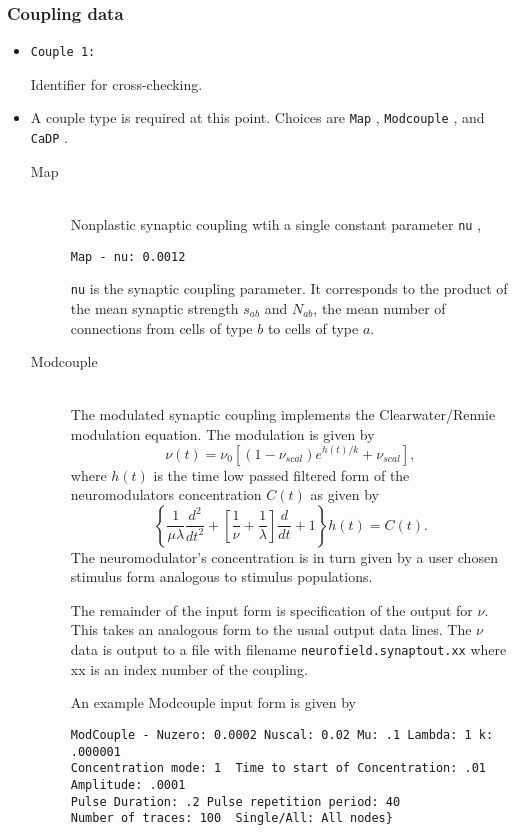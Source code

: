 \documentclass[12pt,a4paper]{article}
\newcommand{\type}[1]{ {\small\small\tt #1} }
\begin{document}
\subsubsection{Coupling data}
\label{sec:couple}

\begin{itemize}

	\item
	\begin{lstlisting}
Couple 1:
	\end{lstlisting}
	Identifier for cross-checking.
	\item A couple type is required at this point. Choices are \type{Map}, \type{Modcouple}, and \type{CaDP}.

\begin{description}

	\item[Map]\ \\
	Nonplastic synaptic coupling wtih a single constant parameter \type{nu},
	\begin{lstlisting}
Map - nu: 0.0012
	\end{lstlisting}
	\type{nu} is the synaptic coupling parameter. It corresponds to the product of the mean synaptic strength $s_{ab}$ and $N_{ab}$, the mean number of connections from cells of type $b$ to cells of type $a$.

	\item[Modcouple]\ \\
	The modulated synaptic coupling implements the Clearwater/Rennie modulation equation. The modulation is given by
	\[ \nu (t) = \nu_0 \left[ ( 1 - \nu_{scal} ) e^{h(t)/k} + \nu_{scal} \right], \]
	where $h(t)$ is the time low passed filtered form of the neuromodulators concentration $C(t)$ as given by
	\[
	\left\{ \frac{1}{\mu \lambda} \frac{d^2}{dt^2} +
	\left[ \frac{1}{\nu}+ \frac{1}{\lambda} 
	\right]
	\frac{d}{dt} + 1
	\right\}
	h(t) = C(t).
	\]
	The neuromodulator's concentration is in turn given by a user chosen stimulus form analogous to stimulus populations.

	The remainder of the input form is specification of the output for $\nu$.  This takes an analogous form to the usual output data lines. The $\nu$ data is output to a file with filename \type{neurofield.synaptout.xx} where xx is an index number of the coupling.

	An example Modcouple input form is given by
	\begin{lstlisting}
ModCouple - Nuzero: 0.0002 Nuscal: 0.02 Mu: .1 Lambda: 1 k: .000001
Concentration mode: 1  Time to start of Concentration: .01 Amplitude: .0001
Pulse Duration: .2 Pulse repetition period: 40
Number of traces: 100  Single/All: All nodes}
	\end{lstlisting}


\end{description}
\end{itemize}
\end{document}
